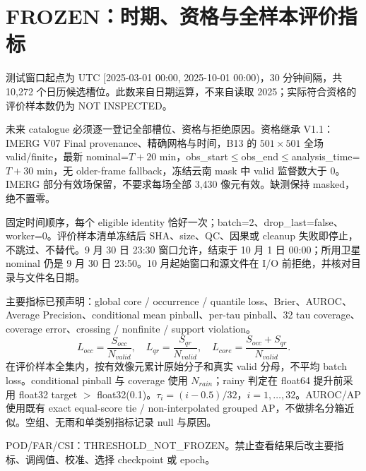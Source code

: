 \documentclass[UTF8,11pt,a4paper,fontset=windows]{ctexart}
\begin{document}
\section{FROZEN：时期、资格与全样本评价指标}
测试窗口起点为 UTC [2025-03-01 00:00, 2025-10-01 00:00)，30 分钟间隔，共 10,272 个日历候选槽位。此数来自日期运算，不来自读取 2025；实际符合资格的评价样本数仍为 NOT INSPECTED。

未来 catalogue 必须逐一登记全部槽位、资格与拒绝原因。资格继承 V1.1：IMERG V07 Final provenance、精确网格与时间，B13 的 $501\times501$ 全场 valid/finite，最新 nominal=$T+20$ min，obs\_start$\leq$obs\_end$\leq$analysis\_time=$T+30$ min，无 older-frame fallback，冻结云南 mask 中 valid 监督数大于 0。IMERG 部分有效场保留，不要求每场全部 3,430 像元有效。缺测保持 masked，绝不置零。

固定时间顺序，每个 eligible identity 恰好一次；batch=2、drop\_last=false、worker=0。评价样本清单冻结后 SHA、size、QC、因果或 cleanup 失败即停止，不跳过、不替代。9 月 30 日 23:30 窗口允许，结束于 10 月 1 日 00:00；所用卫星 nominal 仍是 9 月 30 日 23:50。10 月起始窗口和源文件在 I/O 前拒绝，并核对目录与文件名日期。

主要指标已预声明：global core / occurrence / quantile loss、Brier、AUROC、Average Precision、conditional mean pinball、per-tau pinball、32 tau coverage、coverage error、crossing / nonfinite / support violation。
\[
L_{occ}=\frac{S_{occ}}{N_{valid}},\quad
L_{qr}=\frac{S_{qr}}{N_{valid}},\quad
L_{core}=\frac{S_{occ}+S_{qr}}{N_{valid}}.
\]
在评价样本全集内，按有效像元累计原始分子和真实 valid 分母，不平均 batch loss。conditional pinball 与 coverage 使用 $N_{rain}$；rainy 判定在 float64 提升前采用 float32 target $>$ float32(0.1)。$\tau_i=(i-0.5)/32$，$i=1,\ldots,32$。AUROC/AP 使用既有 exact equal-score tie / non-interpolated grouped AP，不做排名分箱近似。空组、无雨和单类别指标记录 null 与原因。

POD/FAR/CSI：THRESHOLD\_NOT\_FROZEN。禁止查看结果后改主要指标、调阈值、校准、选择 checkpoint 或 epoch。
\end{document}
